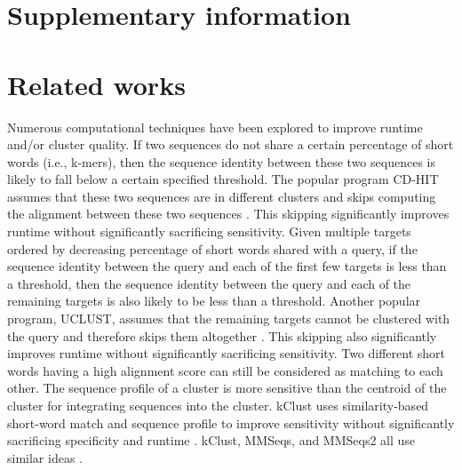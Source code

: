 \documentclass{bioinfo}
\begin{document}



%
%
%
%
%
%
%
%
%





\clearpage{}

\section*{Supplementary information}

\section{Related works}
\label{sec:related-works} 

Numerous computational techniques have been explored to improve runtime and/or cluster quality.
If two sequences do not share a certain percentage of short words (i.e., k-mers), then the sequence identity between these two sequences is likely to fall below a certain specified threshold.
The popular program CD-HIT assumes that these two sequences are in different clusters and skips computing the alignment between these two sequences \citep{li2002tolerating}.
This skipping significantly improves runtime without significantly sacrificing sensitivity.
Given multiple targets ordered by decreasing percentage of short words shared with a query, if the sequence identity between the query and each of the first few targets is less than a threshold, then the sequence identity between the query and each of the remaining targets is also likely to be less than a threshold.
Another popular program, UCLUST, assumes that the remaining targets cannot be clustered with the query and therefore skips them altogether \citep{edgar2010search}.
This skipping also significantly improves runtime without significantly sacrificing sensitivity.
Two different short words having a high alignment score can still be considered as matching to each other.
The sequence profile of a cluster is more sensitive than the centroid of the cluster for integrating sequences into the cluster.
kClust uses similarity-based short-word match and sequence profile to improve sensitivity without significantly sacrificing specificity and runtime \citep{hauser2013kclust}.
kClust, MMSeqs, and MMSeqs2 all use similar ideas \citep{hauser2013kclust,hauser2016mmseqs,steinegger2017mmseqs2}.
\end{document}
